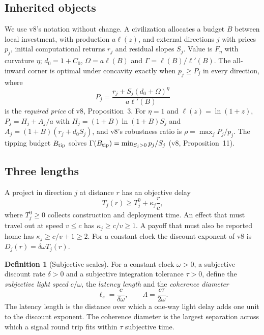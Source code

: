 \documentclass[11pt,a4paper]{article}
\theoremstyle{definition}
\newtheorem{definition}[proposition]{Definition}
\newcommand{\ls}{\ell_s}
\newcommand{\Btip}{B_{\rm tip}}
\begin{document}
\subsection{Inherited objects}
We use v8's notation without change. A civilization allocates a budget $B$
between local investment, with production $a\ell(z)$, and external directions
$j$ with prices $p_j$, initial computational returns $r_j$ and residual slopes
$S_j$. Value is $F_\eta$ with curvature $\eta$; $d_0=1+C_0$,
$\Omega=a\ell(B)$ and $\Gamma=\ell(B)/\ell'(B)$. The all-inward corner is
optimal under concavity exactly when $p_j\geq P_j$ in every direction, where
\begin{equation}
 P_j=\frac{r_j+S_j(d_0+\Omega)^\eta}{a\ell'(B)}
 \label{eq:required-price}
\end{equation}
is the \emph{required price} of v8, Proposition~3. For $\eta=1$ and
$\ell(z)=\ln(1+z)$, $P_j=H_j+A_j/a$ with $H_j=(1+B)\ln(1+B)S_j$ and
$A_j=(1+B)(r_j+d_0S_j)$, and v8's robustness ratio is $\rho=\max_jP_j/p_j$.
The tipping budget $\Btip$ solves $\Gamma(\Btip)=\min_{S_j>0}p_j/S_j$
(v8, Proposition~11).

\subsection{Three lengths}
A project in direction $j$ at distance $r$ has an objective delay
\begin{equation}
 T_j(r)\geq T_j^0+\kappa_j\frac rc,
 \label{eq:delay}
\end{equation}
where $T_j^0\geq0$ collects construction and deployment time. An effect that
must travel out at speed $v\leq c$ has $\kappa_j\geq c/v\geq1$. A payoff that
must also be reported home has $\kappa_j\geq c/v+1\geq2$. For a constant clock
the discount exponent of v8 is $D_j(r)=\delta\omega T_j(r)$.

\begin{definition}[Subjective scales]
\label{def:scales}
For a constant clock $\omega>0$, a subjective discount rate $\delta>0$ and a
subjective integration tolerance $\tau>0$, define the \emph{subjective light
speed} $c/\omega$, the \emph{latency length} and the \emph{coherence diameter}
\begin{equation}
 \ls=\frac{c}{\delta\omega},\qquad
 \Lambda=\frac{c\tau}{2\omega}.
 \label{eq:lengths}
\end{equation}
The latency length is the distance over which a one-way light delay adds one
unit to the discount exponent. The coherence diameter is the largest
separation across which a signal round trip fits within $\tau$ subjective time.
\end{definition}
\end{document}
